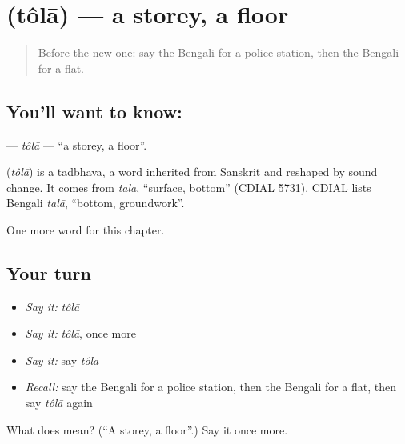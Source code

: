 \section[\texorpdfstring{\bn{তলা} (tôlā)}{তলা (tôlā)}]{ (tôlā) — a storey, a floor}

\label{lesson:BN-C188-tola}



\begin{quote}
Before the new one: say the Bengali for a police station, then the Bengali for a flat.
\end{quote}

\subsection*{You'll want to know: }
\textbf{} — \emph{tôlā} — \textquotedblleft{}a storey, a floor\textquotedblright{}.

\begin{cousinweb}
\textbf{} (\emph{tôlā}) is a tadbhava, a word inherited from Sanskrit and reshaped by sound change. It comes from \emph{tala}, \textquotedblleft{}surface, bottom\textquotedblright{} (CDIAL 5731). CDIAL lists Bengali \emph{talā}, \textquotedblleft{}bottom, groundwork\textquotedblright{}.
\end{cousinweb}

\begin{grammarlens}[title={What you've built}]
One more word for this chapter.
\end{grammarlens}

\subsection*{Your turn}
\begin{itemize}
\raggedright
  \item \emph{Say it:} \emph{tôlā}
  \item \emph{Say it:} \emph{tôlā}, once more
  \item \emph{Say it:} say \emph{tôlā}
  \item \emph{Recall:} say the Bengali for a police station, then the Bengali for a flat, then say \emph{tôlā} again
\end{itemize}

\begin{tcolorbox}[breakable,colback=teal!4,colframe=teal!35!black,title={Before you move on}]
What does  mean? (\textquotedblleft{}A storey, a floor\textquotedblright{}.) Say it once more.
\end{tcolorbox}

